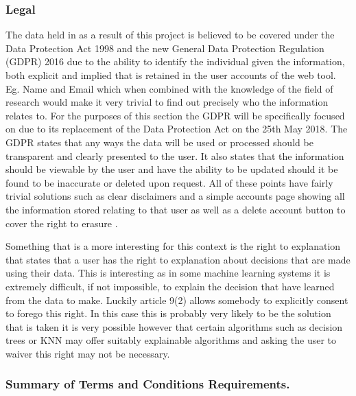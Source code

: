 \documentclass[11pt]{article} %
\numberwithin{equation}{section}
\begin{document}
\subsubsection{Legal }

The data held in as a result of this project is believed to be covered
under the Data Protection Act 1998 and the new General Data Protection
Regulation (GDPR) 2016 due to the ability to identify the individual
given the information, both explicit and implied that is retained in
the user accounts of the web tool. Eg. Name and Email which when combined
with the knowledge of the field of research would make it very trivial
to find out precisely who the information relates to. For the purposes
of this section the GDPR will be specifically focused on due to its
replacement of the Data Protection Act on the 25th May 2018. The GDPR
states that any ways the data will be used or processed should be
transparent and clearly presented to the user. It also states that
the information should be viewable by the user and have the ability
to be updated should it be found to be inaccurate or deleted upon
request. All of these points have fairly trivial solutions such as
clear disclaimers and a simple accounts page showing all the information
stored relating to that user as well as a delete account button to
cover the right to erasure \cite{eu:gdpr}. 

Something that is a more interesting for this context is the right
to explanation that states that a user has the right to explanation
about decisions that are made using their data. This is interesting
as in some machine learning systems it is extremely difficult, if
not impossible, to explain the decision that have learned from the
data to make. Luckily article 9(2) allows somebody to explicitly consent
to forego this right. In this case this is probably very likely to
be the solution that is taken it is very possible however that certain
algorithms such as decision trees or KNN may offer suitably explainable
algorithms and asking the user to waiver this right may not be necessary. 

\subsubsection{Summary of Terms and Conditions Requirements.}
\end{document}
